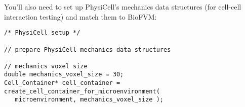 \documentclass[12pt]{article}
\begin{document}
% 
% 

You'll also need to set up PhysiCell's mechanics data structures (for cell-cell interaction testing) and match them to BioFVM: 

\begin{verbatim}
/* PhysiCell setup */ 

// prepare PhysiCell mechanics data structures 

// mechanics voxel size 
double mechanics_voxel_size = 30; 
Cell_Container* cell_container = create_cell_container_for_microenvironment( 
   microenvironment, mechanics_voxel_size );
\end{verbatim}
\end{document}
